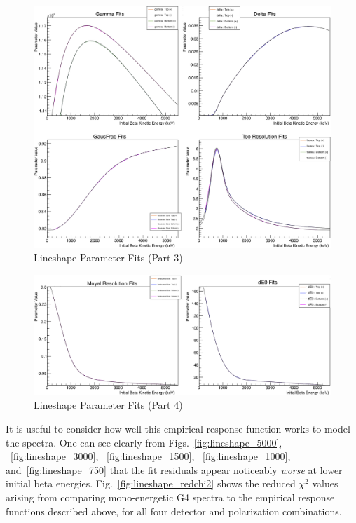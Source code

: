 \begin{figure}[h!!tb]
	\centering
	\includegraphics[width=.999\linewidth]
	{Figures/LineshapeParams_part3.png}
	\caption[Lineshape Parameter Fits (Part 3)]{Lineshape Parameter Fits (Part 3)}	
	\label{fig:lineshapeparams_part3}
\end{figure}
\begin{figure}[h!!tb]
	\centering
	\includegraphics[width=.999\linewidth]
	{Figures/LineshapeParams_part4.png}
	\caption[Lineshape Parameter Fits (Part 4)]{Lineshape Parameter Fits (Part 4)}	
	\label{fig:lineshapeparams_part4}
\end{figure}
%
It is useful to consider how well this empirical response function works to model the spectra.  One can see clearly from Figs.~\ref{fig:lineshape_5000}, ~\ref{fig:lineshape_3000}, ~\ref{fig:lineshape_1500}, ~\ref{fig:lineshape_1000}, and~\ref{fig:lineshape_750} that the fit residuals appear noticeably \emph{worse} at lower initial beta energies.  Fig.~\ref{fig:lineshape_redchi2} shows the reduced $\chi^2$ values arising from comparing mono-energetic G4 spectra to the empirical response functions described above, for all four detector and polarization combinations.


